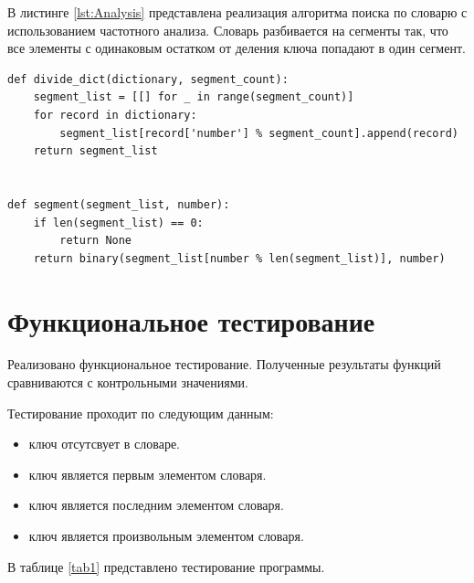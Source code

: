 \documentclass[12pt]{report}
\begin{document}
\newpage
В листинге \ref{lst:Analysis} представлена реализация алгоритма поиска по словарю с использованием частотного анализа. Словарь разбивается на сегменты так, что все элементы с одинаковым остатком от деления ключа попадают в один сегмент.
\begin{lstlisting}[label={lst:Analysis},caption=Реализация алгоритма поиска по словарю с использованием частотного анализа.]
def divide_dict(dictionary, segment_count):
    segment_list = [[] for _ in range(segment_count)]
    for record in dictionary:
        segment_list[record['number'] % segment_count].append(record)
    return segment_list


def segment(segment_list, number):
    if len(segment_list) == 0:
        return None
    return binary(segment_list[number % len(segment_list)], number)
\end{lstlisting}

\section{Функциональное тестирование}

Реализовано функциональное тестирование. Полученные результаты функций сравниваются с контрольными значениями. \vspace{\baselineskip}

Тестирование проходит по следующим данным:
\begin{itemize}
	\item ключ отсутсвует в словаре.
	\item ключ является первым элементом словаря.
	\item ключ является последним элементом словаря.
	\item ключ является произвольным элементом словаря.
\end{itemize}

В таблице \ref{tab1} представлено тестирование программы.
\end{document}
